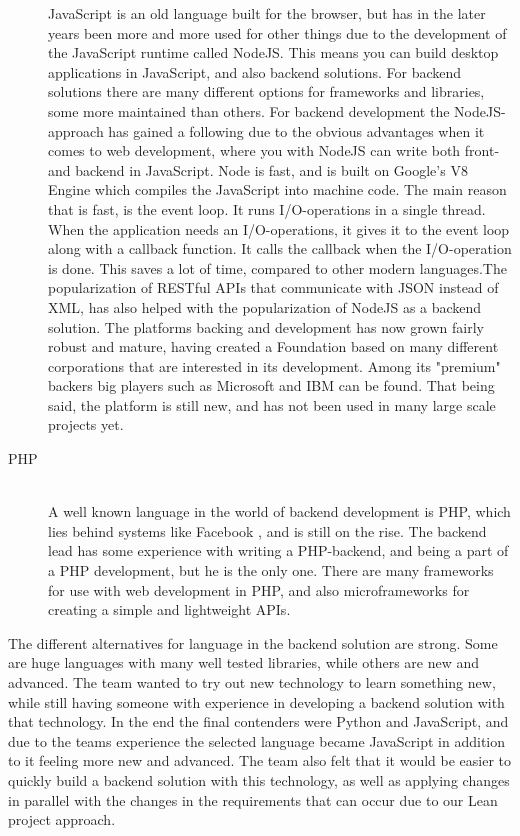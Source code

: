 \begin{description}
        JavaScript is an old language built for the browser, but has in the later years been more and more used for other things due to the development of the JavaScript runtime called NodeJS. This means you can build desktop applications in JavaScript, and also backend solutions. For backend solutions there are many different options for frameworks and libraries, some more maintained than others. For backend development the NodeJS-approach has gained a following due to the obvious advantages when it comes to web development, where you with NodeJS can write both front- and backend in JavaScript. Node is fast, and is built on Google's V8 Engine which compiles the JavaScript into machine code. The main reason that is fast, is the event loop. It runs I/O-operations in a single thread. When the application needs an I/O-operations, it gives it to the event loop along with a callback function. It calls the callback when the I/O-operation is done. This saves a lot of time, compared to other modern languages.\cite{node-about}The popularization of RESTful APIs that communicate with JSON instead of XML, has also helped with the popularization of NodeJS as a backend solution. The platforms backing and development has now grown fairly robust and mature, having created a Foundation based on many different corporations that are interested in its development. Among its "premium" backers big players such as Microsoft and IBM can be found.\cite{node-foundation-members} That being said, the platform is still new, and has not been used in many large scale projects yet.
    \item[PHP] \hfill \\
        A well known language in the world of backend development is PHP, which lies behind systems like Facebook \cite{facebook-backend}, and is still on the rise.\cite{php-rise} The backend lead has some experience with writing a PHP-backend, and being a part of a PHP development, but he is the only one. There are many frameworks for use with web development in PHP, and also microframeworks for creating a simple and lightweight APIs. 
\end{description}

The different alternatives for language in the backend solution are strong. Some are huge languages with many well tested libraries, while others are new and advanced. The team wanted to try out new technology to learn something new, while still having someone with experience in developing a backend solution with that technology. In the end the final contenders were Python and JavaScript, and due to the teams experience the selected language became JavaScript in addition to it feeling more new and advanced. The team also felt that it would be easier to quickly build a backend solution with this technology, as well as applying changes in parallel with the changes in the requirements that can occur due to our Lean project approach.

